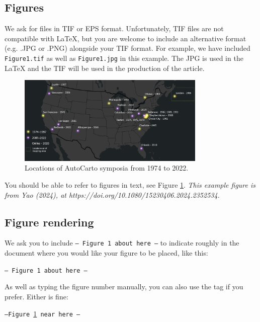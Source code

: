 \documentclass[]{interact}
\theoremstyle{plain}%
\theoremstyle{definition}
\theoremstyle{remark}
\begin{document}
\newpage

\subsection{Figures}

We ask for files in TIF or EPS format. Unfortunately, TIF files are not compatible with LaTeX, but you are welcome to include an alternative format (e.g. .JPG or .PNG) alongside your TIF format. For example, we have included \texttt{Figure1.tif} as well as \texttt{Figure1.jpg} in this example. The JPG is used in the LaTeX and the TIF will be used in the production of the article. 

\begin{figure}[h]
    \centering
    \includegraphics[width=0.8\textwidth]{Figure1.jpg}
    \caption{Locations of AutoCarto symposia from 1974 to 2022.}
    \label{fig:framework}
\end{figure}

You should be able to refer to figures in text, see Figure \ref{fig:framework}. \textit{This example figure is from Yao (2024), at https://doi.org/10.1080/15230406.2024.2352534.} 

\subsection{Figure rendering}

We ask you to include \texttt{--- Figure 1 about here ---} to indicate roughly in the document where you would like your figure to be placed, like this:

\vspace{1\baselineskip}
\texttt{--- Figure 1 about here ---} 
\newline

As well as typing the figure number manually, you can also use the tag if you prefer. Either is fine:

\vspace{1\baselineskip}
\texttt{---Figure \ref{fig:framework} near here ---} 
\\
\end{document}
